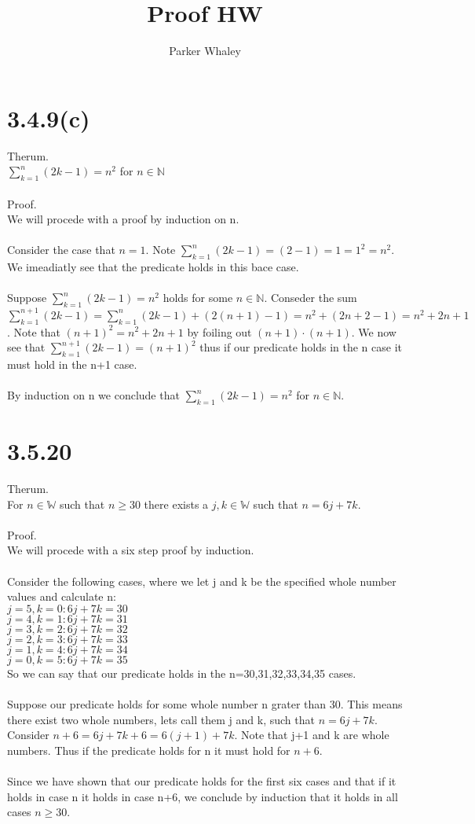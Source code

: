 \documentclass[12pt,a4paper]{article}
\author{Parker Whaley}
\title{Proof HW}
\begin{document}
\maketitle
\section{3.4.9(c)}
Therum.\\
$\sum_{k=1}^n (2k-1)=n^2$ for $n\in \mathbb{N}$\\\\
Proof.\\
We will procede with a proof by induction on n.\\\\
Consider the case that $n=1$.  Note $\sum_{k=1}^n (2k-1)=(2-1)=1=1^2=n^2$.  We imeadiatly see that the predicate holds in this bace case.\\\\
Suppose $\sum_{k=1}^n (2k-1)=n^2$ holds for some $n \in \mathbb{N}$.  Conseder the sum $\sum_{k=1}^{n+1} (2k-1)=\sum_{k=1}^{n} (2k-1)+(2(n+1)-1)=n^2+(2n+2-1)=n^2+2n+1$.  Note that $(n+1)^2=n^2+2n+1$ by foiling out $(n+1)\cdot(n+1)$.  We now see that $\sum_{k=1}^{n+1} (2k-1)=(n+1)^2$ thus if our predicate holds in the n case it must hold in the n+1 case.\\\\
By induction on n we conclude that $\sum_{k=1}^n (2k-1)=n^2$ for $n\in \mathbb{N}$.
\section{3.5.20}
Therum.\\
For $n\in \mathbb{W}$ such that $n\ge 30$ there exists a $j,k\in \mathbb{W}$ such that $n=6j+7k$.\\\\
Proof.\\
We will procede with a six step proof by induction.\\\\
Consider the following cases, where we let j and k be the specified whole number values and calculate n:\\
$j=5,k=0:6j+7k=30$\\
$j=4,k=1:6j+7k=31$\\
$j=3,k=2:6j+7k=32$\\
$j=2,k=3:6j+7k=33$\\
$j=1,k=4:6j+7k=34$\\
$j=0,k=5:6j+7k=35$\\
So we can say that our predicate holds in the n=30,31,32,33,34,35 cases.\\\\
Suppose our predicate holds for some whole number n grater than 30.  This means there exist two whole numbers, lets call them j and k, such that $n=6j+7k$.  Consider $n+6=6j+7k+6=6(j+1)+7k$.  Note that j+1 and k are whole numbers.  Thus if the predicate holds for n it must hold for $n+6$.\\\\
Since we have shown that our predicate holds for the first six cases and that if it holds in case n it holds in case n+6, we conclude by induction that it holds in all cases $n\ge 30$.
\end{document}
